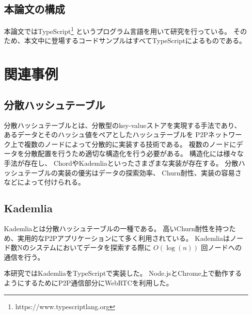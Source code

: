 \documentclass[sotsuron]{jcsie}
\begin{document}
\section{本論文の構成}
本論文ではTypeScript\footnote{https://www.typescriptlang.org}
というプログラム言語を用いて研究を行っている。
そのため、本文中に登場するコードサンプルはすべてTypeScriptによるものである。


\chapter{関連事例}
\section{分散ハッシュテーブル}
分散ハッシュテーブルとは、分散型のkey-valueストアを実現する手法であり、
あるデータとそのハッシュ値をペアとしたハッシュテーブルを
P2Pネットワーク上で複数のノードによって分散的に実装する技術である。
複数のノードにデータを分散配置を行うため適切な構造化を行う必要がある。
構造化には様々な手法が存在し、
ChordやKademliaといったさまざまな実装が存在する。
分散ハッシュテーブルの実装の優劣はデータの探索効率、
Churn耐性、実装の容易さなどによって付けられる。

\section{Kademlia}
Kademliaとは分散ハッシュテーブルの一種である。
高いChurn耐性を持つため、実用的なP2Pアプリケーションにて多く利用されている。
Kademliaはノード数Nのシステムにおいてデータを探索する際に
$O(\log(n))$ 回ノードへの通信を行う。

本研究ではKademliaをTypeScriptで実装した。
Node.jsとChrome上で動作するようにするためにP2P通信部分にWebRTCを利用した。
\end{document}
